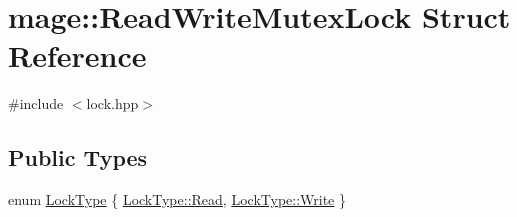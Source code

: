 \hypertarget{structmage_1_1_read_write_mutex_lock}{}\section{mage\+:\+:Read\+Write\+Mutex\+Lock Struct Reference}
\label{structmage_1_1_read_write_mutex_lock}


{\ttfamily \#include $<$lock.\+hpp$>$}

\subsection*{Public Types}
\begin{DoxyCompactItemize}
\item 
enum \hyperlink{structmage_1_1_read_write_mutex_lock_a5fee0529edf58803ee1f5d4afa084a3b}{Lock\+Type} \{ \hyperlink{structmage_1_1_read_write_mutex_lock_a5fee0529edf58803ee1f5d4afa084a3ba7a1a5f3e79fdc91edf2f5ead9d66abb4}{Lock\+Type\+::\+Read}, 
\hyperlink{structmage_1_1_read_write_mutex_lock_a5fee0529edf58803ee1f5d4afa084a3ba1129c0e4d43f2d121652a7302712cff6}{Lock\+Type\+::\+Write}
 \}
\end{DoxyCompactItemize}
